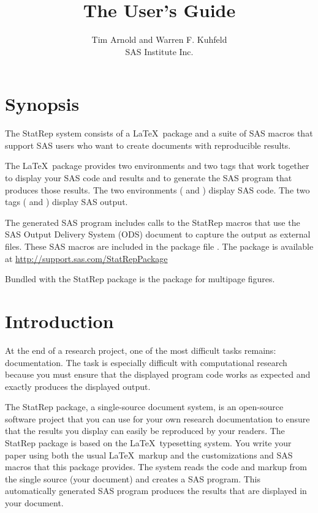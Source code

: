 \documentclass[article,oneside]{memoir}
\title{The \StatRep User's Guide}
\author{Tim Arnold and Warren F. Kuhfeld\\SAS Institute Inc.}
\newcommand*{\StatRep}{\textsf{StatRep}\xspace}
\begin{document}
\maketitle
\tableofcontents*%
\chapter{Synopsis}
The \StatRep system consists of a \LaTeX\ package and a suite of SAS macros that
support SAS users who want to create documents with reproducible results.

The \LaTeX\ package provides two environments and
two tags that work together to display your SAS code and results and to
generate the SAS program that produces those results. The two environments
( and ) display SAS code.
The two tags ( and ) display SAS output.

The generated SAS program includes calls to the \StatRep macros that use the SAS
Output Delivery System (ODS) document to capture the output as external files.
These SAS macros are included in the package file .
The package is available at \url{http://support.sas.com/StatRepPackage}

Bundled with the StatRep package is the  package for
multipage figures.
\chapter{Introduction}

At the end of a research project, one of the most difficult tasks remains: documentation.
The task is especially difficult with computational research because you
must ensure that the displayed program code works as expected and exactly produces the
displayed output.

The \StatRep package, a single-source document system,
is an open-source software project that you can use for your own research documentation
to ensure that the results you display can easily be reproduced by your readers.
The \StatRep package is based on the \LaTeX\ typesetting system. You write your paper using
both the usual \LaTeX\ markup and the customizations and SAS macros that this package provides.
The system reads the code and markup from the single source (your document) and creates a
SAS program. This automatically generated SAS program produces the results that are displayed
in your document.
\end{document}
